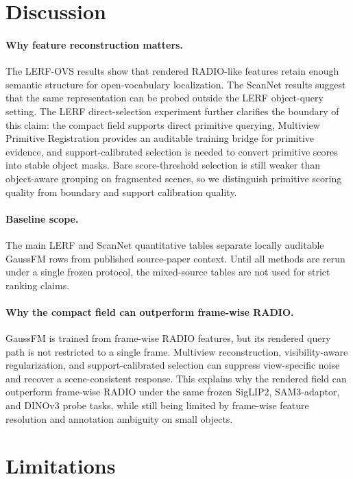 \documentclass[journal,twoside]{IEEEtran}
\newcommand{\method}{GaussFM}
\begin{document}
\section{Discussion}

\paragraph{Why feature reconstruction matters.}
The LERF-OVS results show that rendered RADIO-like features retain enough
semantic structure for open-vocabulary localization. The ScanNet results suggest
that the same representation can be probed outside the LERF object-query setting.
The LERF direct-selection experiment further clarifies the boundary of this
claim: the compact field supports direct primitive querying, Multiview Primitive Registration provides an
auditable training bridge for primitive evidence, and support-calibrated
selection is needed to convert primitive scores into stable object masks. Bare
score-threshold selection is still weaker than object-aware grouping on
fragmented scenes, so we distinguish primitive scoring quality from boundary and
support calibration quality.

\paragraph{Baseline scope.}
The main LERF and ScanNet quantitative tables separate locally auditable
\method{} rows from published source-paper context. Until all methods are rerun
under a single frozen protocol, the mixed-source tables are not used for strict
ranking claims.

\paragraph{Why the compact field can outperform frame-wise RADIO.}
\method{} is trained from frame-wise RADIO features, but its rendered query path is
not restricted to a single frame. Multiview reconstruction, visibility-aware
regularization, and support-calibrated selection can suppress view-specific noise and
recover a scene-consistent response. This explains why the rendered field can
outperform frame-wise RADIO under the same frozen SigLIP2, SAM3-adaptor, and
DINOv3 probe tasks, while still being limited by frame-wise feature resolution and
annotation ambiguity on small objects.

\section{Limitations}
\end{document}
